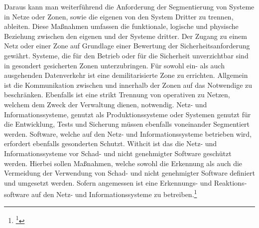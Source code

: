 \documentclass[11pt,a4paper,hidelinks]{article}   %
\begin{document}
\begin{itemize}
                \end{itemize} Daraus kann man weiterführend die Anforderung der Segmentierung von Systeme in Netze oder Zonen, sowie die eigenen von den System Dritter zu trennen, ableiten. Diese Maßnahmen umfassen die funktionale, logische und physische Beziehung zwischen den eigenen und der Systeme dritter. Der Zugang zu einem Netz oder einer Zone auf Grundlage einer Bewertung der Sicherheitsanforderung gewährt. Systeme, die für den Betrieb oder für die Sicherheit unverzichtbar sind in gesondert gesicherten Zonen unterzubringen. Für sowohl ein- als auch ausgehenden Datenverkehr ist eine demilitarisierte Zone zu errichten. Allgemein ist die Kommunikation zwischen und innerhalb der Zonen auf das Notwendige zu beschränken. Ebenfalls ist eine strikt Trennung von operativen zu Netzen, welchem dem Zweck der Verwaltung dienen, notwendig. Netz- und Informationssysteme, genutzt als Produktionssysteme oder Systemen genutzt für die Entwicklung, Tests und Sicherung müssen ebenfalls voneinander Segmentiert werden. Software, welche auf den Netz- und Informationssysteme betrieben wird, erfordert ebenfalls gesonderten Schutzt. Withcit ist das die Netz- und Informationssysteme vor Schad- und nicht genehmigter Software geschützt werden. Hierbei sollen Maßnahmen, welche sowohl die Erkennung als auch die Vermeidung der Verwendung von Schad- und nicht genehmigter Software definiert und umgesetzt werden. Sofern angemessen ist eine Erkennungs- und Reaktions­software auf den Netz- und Informationssysteme zu betreiben.\footnote{
                    \footcite[Vgl. Anhang, Nummer 6.7, 6.8 \& 6.9][]{EU2024-2690}
                }\medbreak
                
\end{document}
